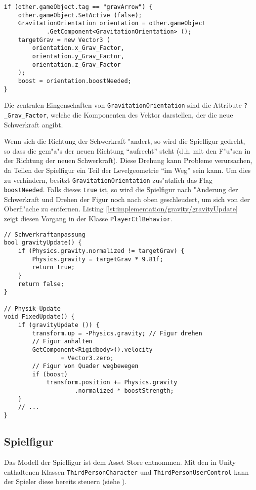 \begin{lstlisting}[caption={Kollision mit Schwerkraftpfeil},label=lst:implementation/gravity/OnTriggerEnter]
if (other.gameObject.tag == "gravArrow") {
    other.gameObject.SetActive (false);
    GravitationOrientation orientation = other.gameObject
            .GetComponent<GravitationOrientation> ();
    targetGrav = new Vector3 (
        orientation.x_Grav_Factor,
        orientation.y_Grav_Factor,
        orientation.z_Grav_Factor
    );
    boost = orientation.boostNeeded;
}
\end{lstlisting}

Die zentralen Eingenschaften von \texttt{GravitationOrientation} sind
die Attribute \texttt{?\_Grav\_Factor}, welche die Komponenten des Vektor darstellen,
der die neue Schwerkraft angibt.

Wenn sich die Richtung der Schwerkraft "andert, so wird die Spielfigur
gedreht, so dass die gem"a"s der neuen Richtung ``aufrecht'' steht
(d.h. mit den F"u"sen in der Richtung der neuen Schwerkraft). Diese
Drehung kann Probleme verursachen, da Teilen der Spielfigur ein Teil
der Levelgeometrie ``im Weg'' sein kann. Um dies zu verhindern, besitzt
\texttt{GravitationOrientation} zus"atzlich das Flag \texttt{boostNeeded}.
Falls dieses \texttt{true} ist, so wird die Spielfigur nach "Anderung
der Schwerkraft und Drehen der Figur noch nach oben geschleudert, um
sich von der Oberfl"ache zu entfernen. Listing
\ref{lst:implementation/gravity/gravityUpdate} zeigt diesen Vorgang
in der Klasse \texttt{PlayerCtlBehavior}.

\begin{lstlisting}[caption={Anpassung der Schwerkraft und Spielfigur},label=lst:implementation/gravity/gravityUpdate]
// Schwerkraftanpassung
bool gravityUpdate() {
    if (Physics.gravity.normalized != targetGrav) {
        Physics.gravity = targetGrav * 9.81f;
        return true;
    }
    return false;
}

// Physik-Update
void FixedUpdate() {
    if (gravityUpdate ()) {
        transform.up = -Physics.gravity; // Figur drehen
        // Figur anhalten
        GetComponent<Rigidbody>().velocity
                = Vector3.zero;
        // Figur von Quader wegbewegen
        if (boost)
            transform.position += Physics.gravity
                    .normalized * boostStrength;
    }
    // ...
}
\end{lstlisting}
%
\subsection{Spielfigur}
\label{sec:implementation/avatar}
Das Modell der Spielfigur ist dem Asset Store entnommen.
Mit den in Unity enthaltenen Klassen \texttt{ThirdPersonCharacter}
und \texttt{ThirdPersonUserControl} kann der Spieler diese
bereits steuern (siehe ).

